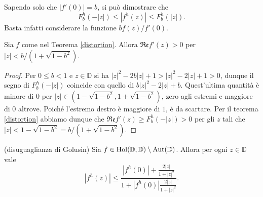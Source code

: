 \begin{oss}
  Sapendo solo che $|f'(0)|=b$, si può dimostrare che
  $$F_b^h(-|z|) \le |f^h(z)| \le F_b^h(|z|).$$
  Basta infatti considerare la funzione $bf(z)/f'(0)$.
\end{oss}

\begin{cor} \label{distorto}
  Sia $f$ come nel Teorema \ref{distortion}. Allora $\mathfrak{Re}f'(z)>0$ per $|z|<b/(1+\sqrt{1-b^2})$.
\end{cor}


\begin{proof}
  Per $0 \le b<1$ e $z \in \mathbb{D}$ si ha $|z|^2-2b|z|+1>|z|^2-2|z|+1>0$, dunque il segno di $F_b^h(-|z|)$ coincide con quello di $b|z|^2-2|z|+b$. Quest'ultima quantità è minore di $0$ per $|z| \in (1-\sqrt{1-b^2}, 1+\sqrt{1-b^2})$, zero agli estremi e maggiore di $0$ altrove. Poiché l'estremo destro è maggiore di $1$, è da scartare.
  Per il teorema \ref{distortion} abbiamo dunque che $\mathfrak{Re}f'(z) \ge F_b^h(-|z|)>0$ per gli $z$ tali che $|z|<1-\sqrt{1-b^2}=b/(1+\sqrt{1-b^2})$.
\end{proof}

\begin{thm} \label{golusin}
  (disuguaglianza di Golusin) Sia $f \in \text{\normalfont{Hol}}(\mathbb{D},\mathbb{D})\setminus\text{\normalfont{Aut}}(\mathbb{D})$. Allora per ogni $z \in \mathbb{D}$ vale
  \begin{equation} \label{gol}
    |f^h(z)| \le \frac{|f^h(0)|+\frac{2|z|}{1+|z|^2}}{1+|f^h(0)|\frac{2|z|}{1+|z|^2}}.
  \end{equation}
\end{thm}

